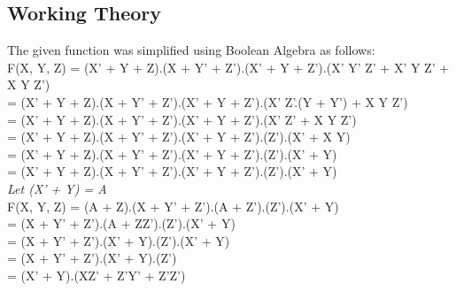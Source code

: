 \documentclass[journal,10pt]{article}
\begin{document}
\subsection{Working Theory}
\begin{flushleft}
The given function was simplified using Boolean Algebra as follows: \vspace{2pt} \\
F(X, Y, Z) = (X' + Y + Z).(X + Y' + Z').(X' + Y + Z').(X' Y' Z' + X' Y Z' + X Y Z') \\
\vspace{1pt}
\hspace{52pt} = (X' + Y + Z).(X + Y' + Z').(X' + Y + Z').(X' Z'.(Y + Y') + X Y Z') \\
\vspace{1pt}
\hspace{52pt} = (X' + Y + Z).(X + Y' + Z').(X' + Y + Z').(X' Z' + X Y Z') \\
\vspace{1pt}
\hspace{52pt} = (X' + Y + Z).(X + Y' + Z').(X' + Y + Z').(Z').(X' + X Y) \\
\vspace{1pt}
\hspace{52pt} = (X' + Y + Z).(X + Y' + Z').(X' + Y + Z').(Z').(X' + Y) \\
\vspace{1pt}
\hspace{52pt} = (X' + Y + Z).(X + Y' + Z').(X' + Y + Z').(Z').(X' + Y) \\
\vspace{3pt}
\textit{Let (X' + Y) = A} \\
\vspace{3pt}
F(X, Y, Z) = (A + Z).(X + Y' + Z').(A + Z').(Z').(X' + Y) \\
\vspace{1pt}
\hspace{52pt} = (X + Y' + Z').(A + ZZ').(Z').(X' + Y) \\
\vspace{1pt}
\hspace{52pt} = (X + Y' + Z').(X' + Y).(Z').(X' + Y) \\
\vspace{1pt}
\hspace{52pt} = (X + Y' + Z').(X' + Y).(Z') \\
\vspace{1pt}
\hspace{52pt} = (X' + Y).(XZ' + Z'Y' + Z'Z') \\

\end{flushleft}
\end{document}
